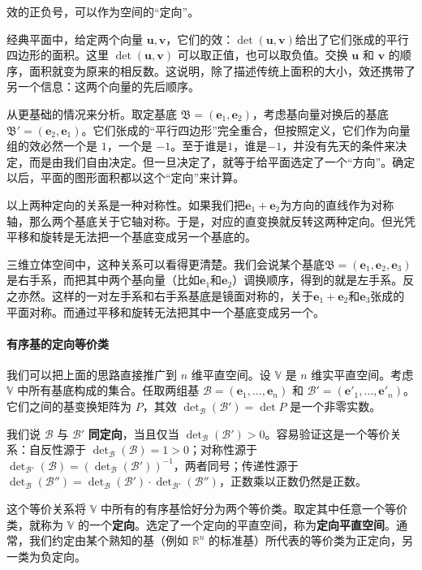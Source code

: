 \documentclass[12pt,UTF8]{ctexbook}
\begin{document}
效的正负号，可以作为空间的“定向”。

经典平面中，给定两个向量 $\mathbf{u}, \mathbf{v}$，它们的效：$\det(\mathbf{u}, \mathbf{v})$给出了它们张成的平行四边形的面积。这里 $\det(\mathbf{u}, \mathbf{v})$ 可以取正值，也可以取负值。交换 $\mathbf{u}$ 和 $\mathbf{v}$ 的顺序，面积就变为原来的相反数。这说明，除了描述传统上面积的大小，效还携带了另一个信息：这两个向量的先后顺序。

从更基础的情况来分析。取定基底 $\mathfrak{B} = (\mathbf{e}_1, \mathbf{e}_2)$，考虑基向量对换后的基底 $\mathfrak{B}' = (\mathbf{e}_2, \mathbf{e}_1)$。它们张成的“平行四边形”完全重合，但按照定义，它们作为向量组的效必然一个是 $1$，一个是 $-1$。至于谁是$1$，谁是$-1$，并没有先天的条件来决定，而是由我们自由决定。但一旦决定了，就等于给平面选定了一个“方向”。确定以后，平面的图形面积都以这个“定向”来计算。

以上两种定向的关系是一种对称性。如果我们把$\mathbf{e}_1+\mathbf{e}_2$为方向的直线作为对称轴，那么两个基底关于它轴对称。于是，对应的直变换就反转这两种定向。但光凭平移和旋转是无法把一个基底变成另一个基底的。

三维立体空间中，这种关系可以看得更清楚。我们会说某个基底$\mathfrak{B} = (\mathbf{e}_1, \mathbf{e}_2, \mathbf{e}_3)$是右手系，而把其中两个基向量（比如$\mathbf{e}_1$和$\mathbf{e}_2$）调换顺序，得到的就是左手系。反之亦然。这样的一对左手系和右手系基底是镜面对称的，关于$\mathbf{e}_1+\mathbf{e}_2$和$\mathbf{e}_3$张成的平面对称。而通过平移和旋转无法把其中一个基底变成另一个。

\paragraph{有序基的定向等价类}
我们可以把上面的思路直接推广到 $n$ 维平直空间。设 $\mathbb{V}$ 是 $n$ 维实平直空间。考虑 $\mathbb{V}$ 中所有基底构成的集合。任取两组基 $\mathcal{B} = (\mathbf{e}_1, \dots, \mathbf{e}_n)$ 和 $\mathcal{B}' = (\mathbf{e}'_1, \dots, \mathbf{e}'_n)$。它们之间的基变换矩阵为 $P$，其效 $\det_{\mathcal{B}}(\mathcal{B}') = \det P$ 是一个非零实数。

我们说 $\mathcal{B}$ 与 $\mathcal{B}'$ \textbf{同定向}，当且仅当 $\det_{\mathcal{B}}(\mathcal{B}') > 0$。容易验证这是一个等价关系：自反性源于 $\det_{\mathcal{B}}(\mathcal{B}) = 1 > 0$；对称性源于 $\det_{\mathcal{B}'}(\mathcal{B}) = (\det_{\mathcal{B}}(\mathcal{B}'))^{-1}$，两者同号；传递性源于 $\det_{\mathcal{B}}(\mathcal{B}'') = \det_{\mathcal{B}}(\mathcal{B}') \cdot \det_{\mathcal{B}'}(\mathcal{B}'')$，正数乘以正数仍然是正数。

这个等价关系将 $\mathbb{V}$ 中所有的有序基恰好分为两个等价类。取定其中任意一个等价类，就称为 $\mathbb{V}$ 的一个\textbf{定向}。选定了一个定向的平直空间，称为\textbf{定向平直空间}。通常，我们约定由某个熟知的基（例如 $\mathbb{R}^n$ 的标准基）所代表的等价类为正定向，另一类为负定向。
\end{document}
